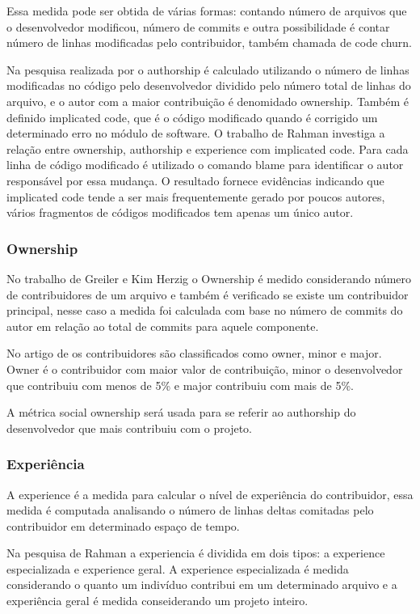 Essa medida pode ser obtida de várias formas: contando número de arquivos que o desenvolvedor modificou, número de commits e outra possibilidade é contar número de linhas modificadas pelo contribuidor, também chamada de code churn\cite{Munson:1998:CCM:850947.853326}.

Na pesquisa realizada por  o authorship é calculado utilizando o número de linhas modificadas no código pelo desenvolvedor dividido pelo número total de linhas do arquivo, e o autor com a maior contribuição é denomidado ownership. Também é definido implicated code, que é o código modificado quando é corrigido um determinado erro no módulo de software. O trabalho de Rahman investiga a relação entre ownership, authorship e experience com implicated code. Para cada linha de código modificado é utilizado o comando blame para identificar o autor responsável por essa mudança. O resultado fornece evidências indicando que implicated code tende a ser mais frequentemente gerado por poucos autores, vários fragmentos de códigos modificados tem apenas um único autor.

\subsubsection{Ownership}
No trabalho de Greiler e Kim Herzig\cite{Greiler} o Ownership é medido considerando número de contribuidores de um arquivo e também é verificado se existe um contribuidor principal, nesse caso a medida foi calculada com base no número de commits do autor em relação ao total de commits para aquele componente.

No artigo de  os contribuidores são classificados como owner, minor e major. Owner é o contribuidor com maior valor de contribuição, minor o desenvolvedor que contribuiu com menos de 5\% e major contribuiu com mais de 5\%.

A métrica social ownership será usada para se referir ao authorship do desenvolvedor que mais contribuiu com o projeto. 

\subsubsection{Experiência}
A experience é a medida para calcular o nível de experiência do contribuidor, essa medida é computada analisando o número de linhas\cite{Rahman2011} deltas comitadas pelo contribuidor em determinado espaço de tempo.

Na pesquisa de Rahman a experiencia é dividida em dois tipos: a experience especializada e experience geral. A experience especializada é medida considerando o quanto um indivíduo contribui em um determinado arquivo e a experiência geral é medida conseiderando um projeto inteiro.

